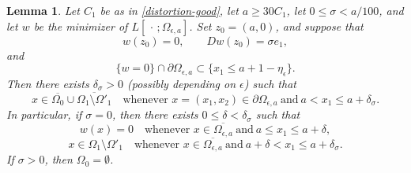 \documentclass[reqno,11pt]{amsart}
\makeatletter
\newtheorem{lem}[thm]{Lemma}%
\numberwithin{equation}{section}
\theoremstyle{remark}
\makeatother
\begin{document}
\begin{lem}\label{stratification}
Let $C_1$ be as in \eqref{distortion-good}, let $a\ge 30C_1$, let $0\le \sigma<a/100$, and let $w$ be the minimizer of $L[\,\cdot\,;\Omega_{\epsilon,a}]$.
Set $z_0=(a,0)$, and suppose that
\[
w(z_0)=0,
\qquad
Dw(z_0)=\sigma e_1,
\]
and
\begin{equation}\label{not-completely-zero}
\{w=0\}\cap\partial\Omega_{\epsilon,a}
\subset \{x_1\le a+1-\eta_\epsilon\}.
\end{equation}
Then there exists $\delta_\sigma>0$ (possibly depending on $\epsilon$) such that
\begin{equation}\label{piece1d}
x\in \overline{\Omega_{0}}\cup \overline{\Omega_{1}\setminus \Omega'_{1}}
\quad \text{whenever } x=(x_1,x_2)\in \partial  {\Omega_{\epsilon,a}}
\ \text{and}\ a< x_1\le a+\delta_\sigma.
\end{equation}
In particular, if $\sigma=0$, then there exists $0\le \delta<\delta_\sigma$ such that
\begin{equation}\label{pieceflat}
w(x)=0
\quad \text{whenever } x\in \overline{\Omega_{\epsilon,a}}\ \text{and}\ a\le x_1\le a+\delta,
\end{equation}
\begin{equation}\label{piecelinear}
x\in \Omega_{1}\setminus \Omega'_{1}
\quad \text{whenever } x\in \overline{\Omega_{\epsilon,a}}\ \text{and}\ a+\delta< x_1\le a+\delta_\sigma.
\end{equation}
If $\sigma>0$, then $\Omega_{0}=\emptyset$.
\end{lem}
\end{document}
